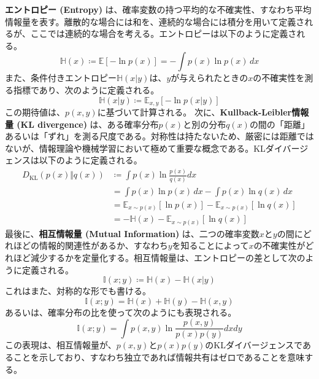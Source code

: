 \textbf{エントロピー (Entropy)} は、確率変数の持つ平均的な不確実性、すなわち平均情報量を表す。離散的な場合には和を、連続的な場合には積分を用いて定義されるが、ここでは連続的な場合を考える。エントロピーは以下のように定義される。
\begin{equation}
\mathbb{H}(x) \coloneqq \mathbb{E}[-\ln p(x)] = -\int p(x) \ln p(x)\,dx
\end{equation}
また、条件付きエントロピー$\mathbb{H}(x|y)$は、$y$が与えられたときの$x$の不確実性を測る指標であり、次のように定義される。
\begin{equation}
\mathbb{H}(x \vert y) \coloneqq \mathbb{E}_{x,y}[-\ln p(x \vert y)]
\end{equation}
この期待値は、$p(x,y)$に基づいて計算される。
次に、\textbf{Kullback-Leibler情報量 (KL divergence)} は、ある確率分布$p(x)$と別の分布$q(x)$の間の「距離」あるいは「ずれ」を測る尺度である。対称性は持たないため、厳密には距離ではないが、情報理論や機械学習において極めて重要な概念である。KLダイバージェンスは以下のように定義される。
\begin{align}
D_{\text{KL}}(p(x)\Vert q(x)) &\coloneqq \int p(x) \ln \frac{p(x)}{q(x)} dx \\
&= \int p(x) \ln p(x)\,dx - \int p(x) \ln q(x)\,dx \\
&= \mathbb{E}_{x\sim p(x)}[\ln p(x)] - \mathbb{E}_{x\sim p(x)}[\ln q(x)] \\
&= -\mathbb{H}(x) - \mathbb{E}_{x\sim p(x)}[\ln q(x)]
\end{align}
最後に、\textbf{相互情報量 (Mutual Information)} は、二つの確率変数$x$と$y$の間にどれほどの情報的関連性があるか、すなわち$y$を知ることによって$x$の不確実性がどれほど減少するかを定量化する。相互情報量は、エントロピーの差として次のように定義される。
\begin{equation}
\mathbb{I}(x;y) \coloneqq \mathbb{H}(x) - \mathbb{H}(x\vert y)
\end{equation}
これはまた、対称的な形でも書ける。
\begin{equation}
\mathbb{I}(x;y) = \mathbb{H}(x) + \mathbb{H}(y) - \mathbb{H}(x,y)
\end{equation}
あるいは、確率分布の比を使って次のようにも表現される。
\begin{equation}
\mathbb{I}(x;y) = \int p(x,y) \ln \frac{p(x,y)}{p(x)p(y)} dxdy
\end{equation}
この表現は、相互情報量が、$p(x,y)$と$p(x)p(y)$のKLダイバージェンスであることを示しており、すなわち独立であれば情報共有はゼロであることを意味する。
